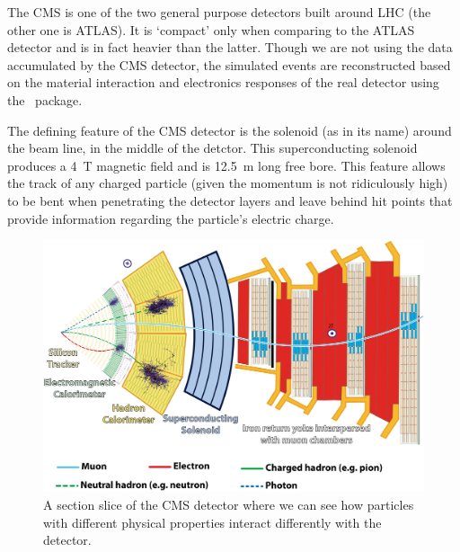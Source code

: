 

The CMS is one of the two general purpose detectors built around LHC (the other one is ATLAS). It
is `compact' only when comparing to the ATLAS detector and is in fact heavier than the latter.
Though we are not using the data accumulated by the CMS detector, the simulated events are
reconstructed based on the material interaction and electronics responses of the real detector using the
\gf~package\cite{geant4}.

The defining feature of the CMS detector is the solenoid (as in its name) around the beam line, in the
middle of the detctor.
This superconducting solenoid produces a \SI{4}{\tesla} magnetic field and is 
\SI{12.5}{\meter} long free bore\cite{solenoid_map}. This feature allows the track of
any charged particle (given the momentum is not ridiculously high) to be bent when penetrating
the detector layers and leave behind hit points that provide information regarding the particle's 
electric charge.


\begin{figure}[htb]
\begin{center}
\includegraphics[width=.75\linewidth]{fig/CMS_Slice.png}
\end{center}
\caption{A section slice of the CMS detector where we can see how 
particles with different physical properties interact differently with the detector.}
\label{fig:CMS_Slice}
\end{figure}

